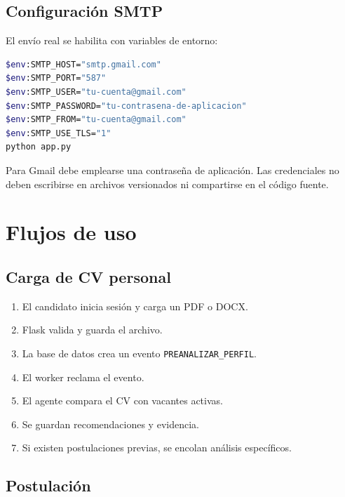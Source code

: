 \documentclass[12pt,a4paper]{article}
\begin{document}
\subsection{Configuración SMTP}

El envío real se habilita con variables de entorno:

\begin{lstlisting}[language=bash,caption={Ejemplo de configuración SMTP para Gmail en PowerShell.}]
$env:SMTP_HOST="smtp.gmail.com"
$env:SMTP_PORT="587"
$env:SMTP_USER="tu-cuenta@gmail.com"
$env:SMTP_PASSWORD="tu-contrasena-de-aplicacion"
$env:SMTP_FROM="tu-cuenta@gmail.com"
$env:SMTP_USE_TLS="1"
python app.py
\end{lstlisting}

Para Gmail debe emplearse una contraseña de aplicación. Las credenciales no deben escribirse en archivos versionados ni compartirse en el código fuente.

\section{Flujos de uso}

\subsection{Carga de CV personal}

\begin{enumerate}[leftmargin=*]
    \item El candidato inicia sesión y carga un PDF o DOCX.
    \item Flask valida y guarda el archivo.
    \item La base de datos crea un evento \texttt{PREANALIZAR\_PERFIL}.
    \item El worker reclama el evento.
    \item El agente compara el CV con vacantes activas.
    \item Se guardan recomendaciones y evidencia.
    \item Si existen postulaciones previas, se encolan análisis específicos.
\end{enumerate}

\subsection{Postulación}
\end{document}
